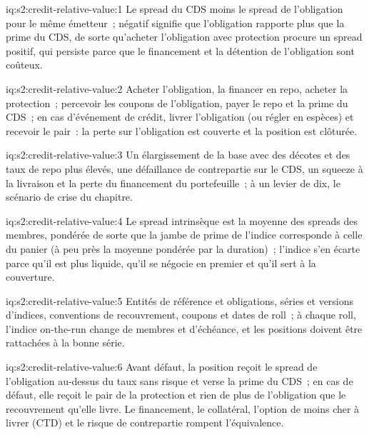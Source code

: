 \begin{solution}{iq:s2:credit-relative-value:1}
Le spread du CDS moins le spread de l'obligation pour le même émetteur~; négatif signifie que l'obligation rapporte plus que la prime du CDS, de sorte qu'acheter l'obligation avec protection
procure un spread positif, qui persiste parce que le financement et la détention de l'obligation sont coûteux.
\end{solution}

\begin{solution}{iq:s2:credit-relative-value:2}
Acheter l'obligation, la financer en repo, acheter la protection~; percevoir les coupons de l'obligation, payer le repo et la prime du CDS~; en cas d'événement de crédit, livrer l'obligation (ou régler en
espèces) et recevoir le pair~: la perte sur l'obligation est couverte et la position est clôturée.
\end{solution}

\begin{solution}{iq:s2:credit-relative-value:3}
Un élargissement de la base avec des décotes et des taux de repo plus élevés, une défaillance de contrepartie sur le CDS, un squeeze à la livraison et la perte du
financement du portefeuille~; à un levier de dix, le scénario de crise du chapitre.
\end{solution}

\begin{solution}{iq:s2:credit-relative-value:4}
Le spread intrinsèque est la moyenne des spreads des membres, pondérée de sorte que la jambe de prime de l'indice corresponde à celle du panier (à peu près la moyenne pondérée par la duration)~;
l'indice s'en écarte parce qu'il est plus liquide, qu'il se négocie en premier et qu'il sert à la couverture.
\end{solution}

\begin{solution}{iq:s2:credit-relative-value:5}
Entités de référence et obligations, séries et versions d'indices, conventions de recouvrement, coupons et dates de roll~; à chaque roll, l'indice on-the-run change de
membres et d'échéance, et les positions doivent être rattachées à la bonne série.
\end{solution}

\begin{solution}{iq:s2:credit-relative-value:6}
Avant défaut, la position reçoit le spread de l'obligation au-dessus du taux sans risque et verse la prime du CDS~; en cas de défaut, elle reçoit le pair de la protection
et rien de plus de l'obligation que le recouvrement qu'elle livre. Le financement, le collatéral, l'option de moins cher à livrer (CTD) et le risque de contrepartie
rompent l'équivalence.
\end{solution}
